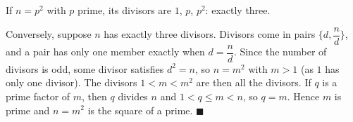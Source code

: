 If $n=p^2$ with $p$ prime, its divisors are $1$, $p$, $p^2$: exactly three.

Conversely, suppose $n$ has exactly three divisors. Divisors come in pairs $\{d,\dfrac nd\}$, and a pair has only one member exactly when $d=\dfrac nd$. Since the number of divisors is odd, some divisor satisfies $d^2=n$, so $n=m^2$ with $m>1$ (as $1$ has only one divisor). The divisors $1<m<m^2$ are then all the divisors. If $q$ is a prime factor of $m$, then $q$ divides $n$ and $1<q\le m<n$, so $q=m$. Hence $m$ is prime and $n=m^2$ is the square of a prime. $\blacksquare$

